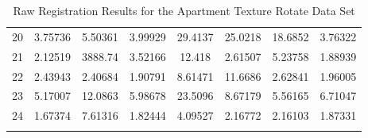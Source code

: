 \begin{center}
\begin{longtable}{cccccccc}
20 & 3.75736 & 5.50361 & 3.99929 & 29.4137 & 25.0218 & 18.6852 & 3.76322\\
21 & 2.12519 & 3888.74 & 3.52166 & 12.418 & 2.61507 & 5.23758 & 1.88939\\
22 & 2.43943 & 2.40684 & 1.90791 & 8.61471 & 11.6686 & 2.62841 & 1.96005\\
23 & 5.17007 & 12.0863 & 5.98678 & 23.5096 & 8.67179 & 5.56165 & 6.71047\\
24 & 1.67374 & 7.61316 & 1.82444 & 4.09527 & 2.16772 & 2.16103 & 1.87331\\
\caption{Raw Registration Results for the Apartment Texture Rotate Data Set}
\label{tab:apartmenttexturerotateFULL}
\end{longtable}
\end{center} 


